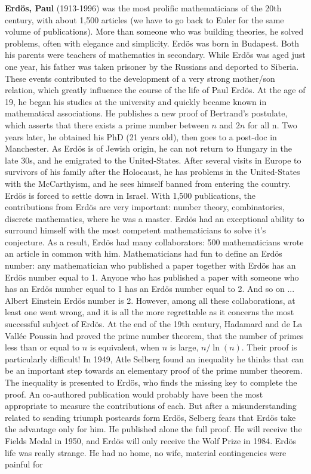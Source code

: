 \textbf{Erdös, Paul} (1913-1996) was the most prolific mathematicians of the 20th century, with about 1,500 articles (we have to go back to Euler for the same volume of publications). More than someone who was building theories, he solved problems, often with elegance and simplicity. Erdös was born in Budapest. Both his parents were teachers of mathematics in secondary. While Erdös was aged just one year, his father was taken prisoner by the Russians and deported to Siberia. These events contributed to the development of a very strong mother/son relation, which greatly influence the course of the life of Paul Erdös. At the age of 19, he began his studies at the university and quickly became known in mathematical associations. He publishes a new proof of Bertrand's postulate, which asserts that there exists a prime number between $n$ and $2n$ for all n. Two years later, he obtained his PhD (21 years old), then goes to a post-doc in Manchester. As Erdös is of Jewish origin, he can not return to Hungary in the late 30s, and he emigrated to the United-States. After several visits in Europe to survivors of his family after the Holocaust, he has problems in the United-States with the McCarthyism, and he sees himself banned from entering the country. Erdös is forced to settle down in Israel. With 1,500 publications, the contributions from Erdös are very important: number theory, combinatorics, discrete mathematics, where he was a master. Erdös had an exceptional ability to surround himself with the most competent mathematicians to solve it's conjecture. As a result, Erdös had many collaborators: 500 mathematicians wrote an article in common with him. Mathematicians had fun to define an Erdös number: any mathematician who published a paper together with Erdös has an Erdös number equal to 1. Anyone who has published a paper with someone who has an Erdös number equal to 1 has an Erdös number equal to 2. And so on ... Albert Einstein Erdös number is 2. However, among all these collaborations, at least one went wrong, and it is all the more regrettable as it concerns the most successful subject of Erdös. At the end of the 19th century, Hadamard and de La Vallée Poussin had proved the prime number theorem, that the number of primes less than or equal to $n$ is equivalent, when $n$ is large, $n/\ln(n)$. Their proof is particularly difficult! In 1949, Atle Selberg found an inequality he thinks that can be an important step towards an elementary proof of the prime number theorem. The inequality is presented to Erdös, who finds the missing key to complete the proof. An co-authored publication would probably have been the most appropriate to measure the contributions of each. But after a misunderstanding related to sending triumph postcards form Erdös, Selberg fears that Erdös take the advantage only for him. He published alone the full proof. He will receive the Fields Medal in 1950, and Erdös will only receive the Wolf Prize in 1984. Erdös life was really strange. He had no home, no wife, material contingencies were painful for 